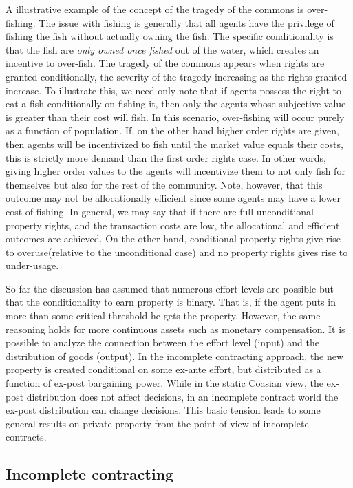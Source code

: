 A illustrative example of the concept of the tragedy of the commons is over-fishing. The issue with fishing is generally that all agents have the privilege of fishing the fish without actually owning the fish. The specific conditionality is that the fish are \textit{only owned once fished} out of the water, which creates an incentive to over-fish. The tragedy of the commons appears when rights are granted conditionally, the severity of the tragedy increasing as the rights granted increase. To illustrate this, we need only note that if agents possess the right to eat a fish conditionally on fishing it, then only the agents whose subjective value is greater than their cost will fish. In this scenario, over-fishing will occur purely as a function of population. If, on the other hand higher order rights are given, then agents will be incentivized to fish until the market value equals their costs, this is strictly more demand than the first order rights case. In other words, giving higher order values to the agents will incentivize them to not only fish for themselves but also for the rest of the community. Note, however, that this outcome may not be allocationally efficient since some agents may have a lower cost of fishing. In general, we may say that if there are full unconditional property rights, and the transaction costs are low, the allocational and efficient outcomes are achieved. On the other hand, conditional property rights give rise to overuse(relative to the unconditional case) and no property rights gives rise to under-usage.

So far the discussion has assumed that numerous effort levels are possible but that the conditionality to earn property is binary. That is, if the agent puts in more than some critical threshold he gets the property. However, the same reasoning holds for more continuous assets such as monetary compensation. It is possible to analyze the connection between the effort level (input) and the distribution of goods (output). In the incomplete contracting approach, the new property is created conditional on some ex-ante effort, but distributed as a function of ex-post bargaining power. While in the static Coasian view, the ex-post distribution does not affect decisions, in an incomplete contract world the ex-post distribution can change decisions. This basic tension leads to some general results on private property from the point of view of incomplete contracts.

\subsection{Incomplete contracting} \label{incomplete}

